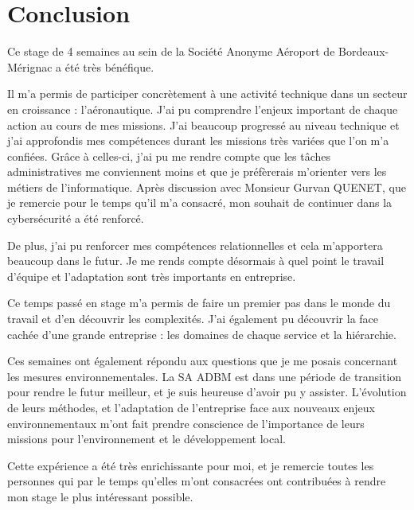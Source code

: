 \chapter{Conclusion}

Ce stage de 4 semaines au sein de la Société Anonyme Aéroport de Bordeaux-Mérignac a été très bénéfique.\newline

Il m'a permis de participer concrètement à une activité technique dans un secteur en croissance : l'aéronautique. J'ai pu comprendre l'enjeux important de chaque action au cours de mes missions. J'ai beaucoup progressé au niveau technique et j'ai approfondis mes compétences durant les missions très variées que l'on m'a confiées. Grâce à celles-ci, j'ai pu me rendre compte que les tâches administratives me conviennent moins et que je préfèrerais m'orienter vers les métiers de l'informatique. Après discussion avec Monsieur Gurvan QUENET, que je remercie pour le temps qu'il m'a consacré, mon souhait de continuer dans la cybersécurité a été renforcé.

De plus, j'ai pu renforcer mes compétences relationnelles et cela m'apportera beaucoup dans le futur. Je me rends compte désormais à quel point le travail d'équipe et l'adaptation sont très importants en entreprise.

Ce temps passé en stage m’a permis de faire un premier pas dans le monde du travail et d’en découvrir les complexités. J’ai également pu découvrir la face cachée d’une grande entreprise : les domaines de chaque service et la hiérarchie.

Ces semaines ont également répondu aux questions que je me posais concernant les mesures environnementales. La SA ADBM est dans une période de transition pour rendre le futur meilleur, et je suis heureuse d'avoir pu y assister. L'évolution de leurs méthodes, et l'adaptation de l'entreprise face aux nouveaux enjeux environnementaux m'ont fait prendre conscience de l'importance de leurs missions pour l'environnement et le développement local.\newline

Cette expérience a été très enrichissante pour moi, et je remercie toutes les personnes qui par le temps qu'elles m'ont consacrées ont contribuées à rendre mon stage le plus intéressant possible.